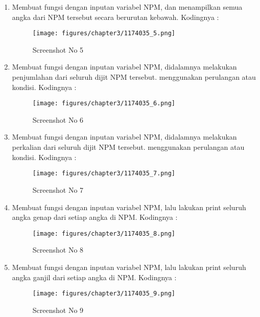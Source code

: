 \begin{enumerate}
\begin{figure}[!htbp]
	\end{figure}
	\item Membuat fungsi dengan inputan variabel NPM, dan menampilkan semua angka dari NPM tersebut secara berurutan kebawah. Kodingnya : 
	
	\begin{figure}[!htbp]
        \centering
        \texttt{[image: figures/chapter3/1174035\_5.png]}
        \caption{Screenshot No 5}
        \label{1174035_5}
	\end{figure}
	\item Membuat fungsi dengan inputan variabel NPM, didalamnya melakukan penjumlahan dari seluruh dijit NPM tersebut. menggunakan perulangan atau kondisi. Kodingnya : 
	
	\begin{figure}[!htbp]
        \centering
        \texttt{[image: figures/chapter3/1174035\_6.png]}
        \caption{Screenshot No 6}
        \label{1174035_6}
	\end{figure}
	\item Membuat fungsi dengan inputan variabel NPM, didalamnya melakukan perkalian dari seluruh dijit NPM tersebut. menggunakan perulangan atau kondisi. Kodingnya : 
	
	\begin{figure}[!htbp]
        \centering
        \texttt{[image: figures/chapter3/1174035\_7.png]}
        \caption{Screenshot No 7}
        \label{1174035_7}
	\end{figure}
	\item Membuat fungsi dengan inputan variabel NPM, lalu lakukan print seluruh angka genap dari setiap angka di NPM. Kodingnya : 
	
	\begin{figure}[!htbp]
        \centering
        \texttt{[image: figures/chapter3/1174035\_8.png]}
        \caption{Screenshot No 8}
        \label{1174035_8}
	\end{figure}
	\item Membuat fungsi dengan inputan variabel NPM, lalu lakukan print seluruh angka ganjil dari setiap angka di NPM. Kodingnya : 
	
	\begin{figure}[!htbp]
        \centering
        \texttt{[image: figures/chapter3/1174035\_9.png]}
        \caption{Screenshot No 9}
        \label{1174035_9}
	\end{figure}

\end{enumerate}
